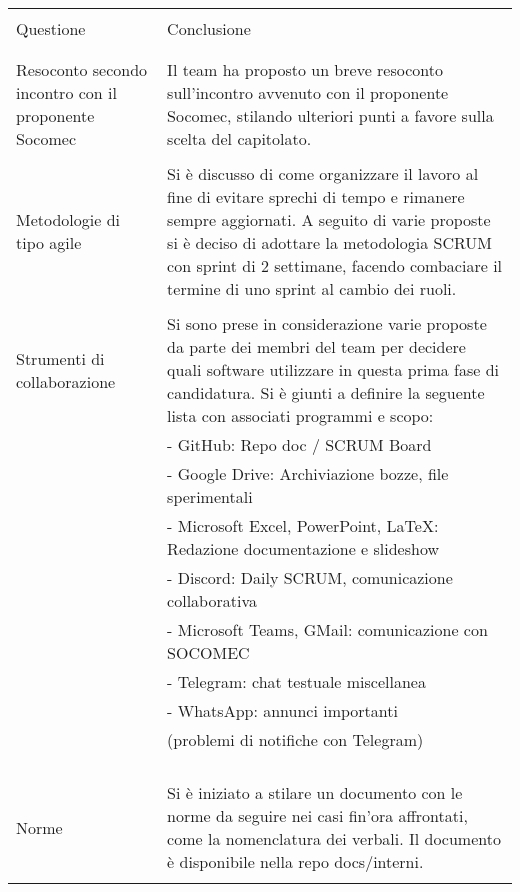 \begin{longtable}{|p{7cm}|p{8cm}|}
    \hline
    & \\
    Questione & Conclusione\\
    & \\
    \hline
    & \\

    Resoconto secondo incontro con il proponente Socomec
    &
    Il team ha proposto un breve resoconto sull'incontro
    avvenuto con il proponente Socomec, stilando ulteriori
    punti a favore sulla scelta del capitolato.\\

    & \\

    Metodologie di tipo agile
    &
    Si è discusso di come organizzare il lavoro al fine di
    evitare sprechi di tempo e rimanere sempre aggiornati.
    A seguito di varie proposte si è deciso di adottare la
    metodologia SCRUM con sprint di 2 settimane, facendo
    combaciare il termine di uno sprint al cambio dei ruoli.\\

    & \\

    Strumenti di collaborazione
    &
    Si sono prese in considerazione varie proposte da parte
    dei membri del team per decidere quali software
    utilizzare in questa prima fase di candidatura.
    Si è giunti a definire la seguente lista con associati
    programmi e scopo:\\ &
    - GitHub: Repo doc / SCRUM Board \\ &
    - Google Drive: Archiviazione bozze, file sperimentali \\ &
    - Microsoft Excel, PowerPoint, LaTeX: Redazione documentazione e slideshow\\ &
    - Discord: Daily SCRUM, comunicazione collaborativa \\ &
    - Microsoft Teams, GMail: comunicazione con SOCOMEC \\ &
    - Telegram: chat testuale miscellanea\\ &
    - WhatsApp: annunci importanti \\ &
    (problemi di notifiche con Telegram)\\

    & \\
    & \\
    & \\
    \hline
    & \\

    Norme
    &
    Si è iniziato a stilare un documento con le norme da
    seguire nei casi fin'ora affrontati, come la nomenclatura
    dei verbali. Il documento è disponibile nella repo
    docs/interni.\\
    
    & \\

    \hline
\end{longtable}

